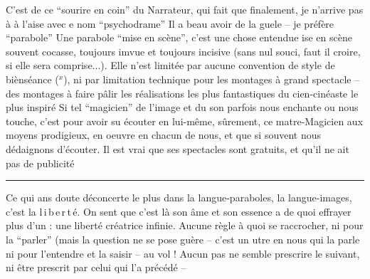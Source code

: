 C'est de   ce ``sourire en coin'' du Narrateur, qui fait
que finalement, je  n'arrive pas à   à l'aise
avec  e nom ``psychodrame''\handwritten{,}  Il a beau avoir de
la guele -- je préfère   ``parabole'' 
Une parabole  ``mise en scène'', c'est une chose entendue\handwritten{,}  
 ise en scène souvent cocasse, toujours imvue et toujours incisive
(sans nul souci, faut il croire, si elle sera comprise...). Elle n'est
limitée par aucune convention\handwritten{,} de style  de biènséance ($^{x}$), ni par 
limitation technique pour les montages à grand spectacle -- des montages
à faire pâlir les réalisations les plus fantastiques du cien-cinéaste
le plus inspiré\handwritten{!} Si tel ``magicien'' de l'image et  du son parfois nous enchante
ou nous touche, c'est pour avoir su écouter en lui-même, sûrement,
ce matre-Magicien aux moyens prodigieux, en oeuvre en chacun de nous, et
que si souvent nous dédaignons d'écouter. Il est vrai que ses spectacles
sont gratuits, et qu'il ne ait pas de publicité

\noindent\rule{.23\linewidth}{.3pt}

Ce qui ans doute déconcerte le plus dans la langue-paraboles, la
langue-images, c'est la \mbox{l\,i\,b\,e\,r\,t\,é}. On sent que c'est là son âme et
son essence\handwritten{,}   a de quoi effrayer plus d'un : une liberté créatrice infinie.
Aucune règle à quoi se raccrocher, ni pour la ``parler'' (mais la
question ne se pose guère -- c'est  un  utre en nous qui la parle
ni pour l'entendre et la saisir -- au vol ! Aucun pas ne semble prescrire
le suivant, ni être prescrit par celui qui l'a précédé -- 
